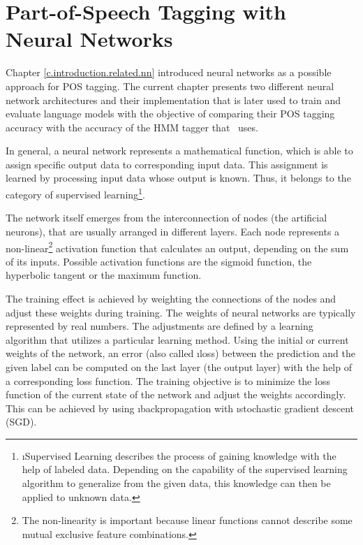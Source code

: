 \chapter{Part-of-Speech Tagging with Neural Networks}\label{c.postagging}
Chapter \ref{c.introduction.related.nn} introduced neural networks as a possible approach for POS tagging. The current chapter presents two different neural network architectures and their implementation that is later used to train and evaluate language models with the objective of comparing their POS tagging accuracy with the accuracy of the HMM tagger that \Alex\ uses.

In general, a neural network represents a mathematical function, which is able to assign specific output data to corresponding input data. This assignment is learned by processing input data whose output is known. Thus, it belongs to the category of supervised learning\footnote{\i{Supervised Learning} describes the process of gaining knowledge with the help of labeled data. Depending on the capability of the supervised learning algorithm to generalize from the given data, this knowledge can then be applied to unknown data.}.

The network itself emerges from the interconnection of nodes (the artificial neurons), that are usually arranged in different layers. Each node represents a non-linear\footnote{The non-linearity is important because linear functions cannot describe some mutual exclusive feature combinations.} activation function that calculates an output, depending on the sum of its inputs. Possible activation functions are the sigmoid function, the hyperbolic tangent or the maximum function.

The training effect is achieved by weighting the connections of the nodes and adjust these weights during training. The weights of neural networks are typically represented by real numbers. The adjustments are defined by a learning algorithm that utilizes a particular learning method. Using the initial or current weights of the network, an error (also called \i{loss}) between the prediction and the given label can be computed on the last layer (the output layer) with the help of a corresponding loss function. The training objective is to minimize the loss function of the current state of the network and adjust the weights accordingly. This can be achieved by using \i{backpropagation} with \i{stochastic gradient descent} (SGD).

